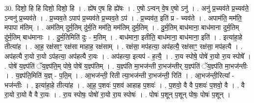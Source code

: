 \documentclass[17pt]{extarticle}
\begin{document}
30. दिशो॒ हि हि दिशो॒ दिशो॒ हि । . ह्ये॑ष ए॒ष हि ह्ये॑षः । . ए॒षो ऽन्वन् वे॒ष ए॒षो ऽनु॑ । . अनु॑ प्र॒च्यव॑ते प्र॒च्यव॑ते॒ ऽन्वनु॑ प्र॒च्यव॑ते । . प्र॒च्यव॒ते ऽपाप॑ प्र॒च्यव॑ते प्र॒च्यव॒ते ऽप॑ । . प्र॒च्यव॑त॒ इति॑ प्र - च्यव॑ते । . अपाम॑ति॒ मम॑ति॒ मपापा म॑तिम् । . अम॑तिम् दुर्म॒तिम् दु॑र्म॒ति मम॑ति॒ मम॑तिम् दुर्म॒तिम् । . दु॒र्म॒तिम् बाध॑माना॒ बाध॑माना दुर्म॒तिम् दु॑र्म॒तिम् बाध॑मानाः । . दु॒र्म॒तिमिति॑ दुः - म॒तिम् । . बाध॑माना॒ इतीति॒ बाध॑माना॒ बाध॑माना॒ इति॑ । . इत्या॑हा॒हे तीत्या॑ह । . आ॒ह॒ रक्ष॑साꣳ॒॒ रक्ष॑सा माहाह॒ रक्ष॑साम् । . रक्ष॑सा॒ मप॑हत्या॒ अप॑हत्यै॒ रक्ष॑साꣳ॒॒ रक्ष॑सा॒ मप॑हत्यै । . अप॑हत्यै रा॒यो रा॒यो ऽप॑हत्या॒ अप॑हत्यै रा॒यः । . अप॑हत्या॒ इत्यप॑ - ह॒त्यै॒ । . रा॒य स्पोषे॒ पोषे॑ रा॒यो रा॒य स्पोषे᳚ । . पोषे॑ य॒ज्ञ्प॑तिं ॅय॒ज्ञ्प॑ति॒म् पोषे॒ पोषे॑ य॒ज्ञ्प॑तिम् । . य॒ज्ञ्प॑ति मा॒भज॑न्ती रा॒भज॑न्तीर् य॒ज्ञ्प॑तिं ॅय॒ज्ञ्प॑ति मा॒भज॑न्तीः । . य॒ज्ञ्प॑ति॒मिति॑ य॒ज्ञ् - प॒ति॒म् । . आ॒भज॑न्ती॒ रिती त्या॒भज॑न्ती रा॒भज॑न्ती॒ रिति॑ । . आ॒भज॑न्ती॒रित्या᳚ - भज॑न्तीः । . इत्या॑हा॒हे तीत्या॑ह । . आ॒ह॒ प॒शवः॑ प॒शव॑ आहाह प॒शवः॑ । . प॒शवो॒ वै वै प॒शवः॑ प॒शवो॒ वै । . वै रा॒यो रा॒यो वै वै रा॒यः । . रा॒य स्पोषः॒ पोषो॑ रा॒यो रा॒य स्पोषः॑ । . पोषः॑ प॒शून् प॒शून् पोषः॒ पोषः॑ प॒शून् । \newline
\end{document}
